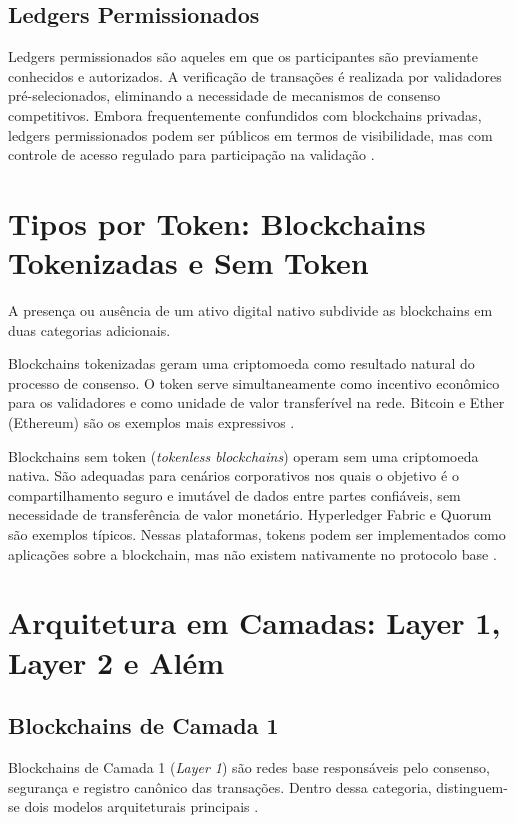 \documentclass[12pt,a4paper]{report}
\begin{document}
\subsection{Ledgers Permissionados}

Ledgers permissionados são aqueles em que os participantes são previamente conhecidos e autorizados. A verificação de transações é realizada por validadores pré-selecionados, eliminando a necessidade de mecanismos de consenso competitivos. Embora frequentemente confundidos com blockchains privadas, ledgers permissionados podem ser públicos em termos de visibilidade, mas com controle de acesso regulado para participação na validação \cite{Bashir2023}.

\section[Tipos por Token]{Tipos por Token: Blockchains Tokenizadas e Sem Token}

A presença ou ausência de um ativo digital nativo subdivide as blockchains em duas categorias adicionais.

Blockchains tokenizadas geram uma criptomoeda como resultado natural do processo de consenso. O token serve simultaneamente como incentivo econômico para os validadores e como unidade de valor transferível na rede. Bitcoin e Ether (Ethereum) são os exemplos mais expressivos \cite{Bashir2023}.

Blockchains sem token (\textit{tokenless blockchains}) operam sem uma criptomoeda nativa. São adequadas para cenários corporativos nos quais o objetivo é o compartilhamento seguro e imutável de dados entre partes confiáveis, sem necessidade de transferência de valor monetário. Hyperledger Fabric e Quorum são exemplos típicos. Nessas plataformas, tokens podem ser implementados como aplicações sobre a blockchain, mas não existem nativamente no protocolo base \cite{Bashir2023}.

\section[Arquitetura em Camadas]{Arquitetura em Camadas: Layer 1, Layer 2 e Além}

\subsection{Blockchains de Camada 1}

Blockchains de Camada 1 (\textit{Layer 1}) são redes base responsáveis pelo consenso, segurança e registro canônico das transações. Dentro dessa categoria, distinguem-se dois modelos arquiteturais principais \cite{Bashir2023}.
\end{document}
